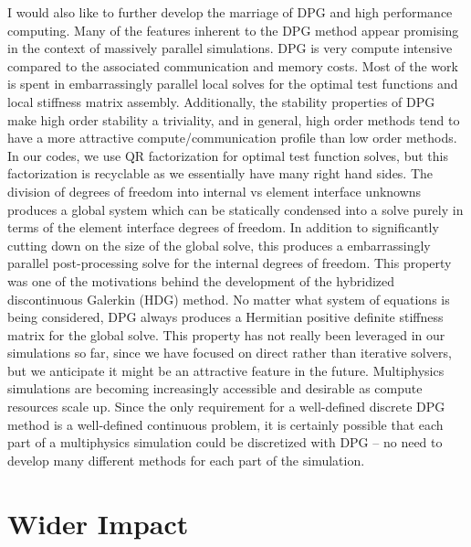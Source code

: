 \documentclass[letterpaper,12pt]{article}
\begin{document}
I would also like to further develop the marriage of DPG and high performance computing.
Many of the features inherent to the DPG method appear promising in the context of massively parallel simulations.
DPG is very compute intensive compared to the associated communication and memory costs.
Most of the work is spent in embarrassingly parallel local solves for the optimal test functions and local stiffness matrix assembly.
Additionally, the stability properties of DPG make high order stability a triviality, and in general, 
high order methods tend to have a more attractive compute/communication profile than low order methods.
In our codes, we use QR factorization for optimal test function solves, but this factorization is recyclable as we essentially have many right hand sides.
The division of degrees of freedom into internal vs element interface unknowns produces a global system which can be statically condensed into 
a solve purely in terms of the element interface degrees of freedom.
In addition to significantly cutting down on the size of the global solve, 
this produces a embarrassingly parallel post-processing solve for the internal degrees of freedom.
This property was one of the motivations behind the development of the hybridized discontinuous Galerkin (HDG) \cite{HDG} method.
No matter what system of equations is being considered, DPG always produces a Hermitian 
positive definite stiffness matrix for the global solve.
This property has not really been leveraged in our simulations so far, since we have focused on direct rather than iterative solvers, but we
anticipate it might be an attractive feature in the future.
Multiphysics simulations are becoming increasingly accessible and desirable as compute resources scale up.
Since the only requirement for a well-defined discrete DPG method is a well-defined continuous problem, 
it is certainly possible that each part of a multiphysics simulation could be discretized with DPG -- 
no need to develop many different methods for each part of the simulation.

\section*{Wider Impact}
\end{document}
